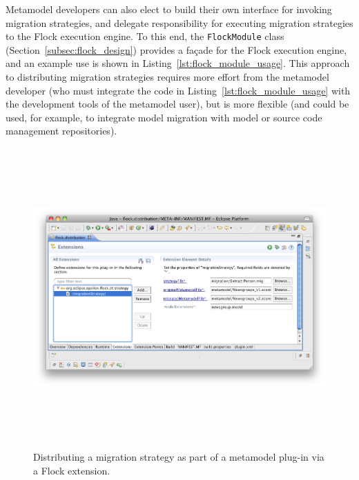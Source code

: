 Metamodel developers can also elect to build their own interface for invoking migration strategies, and delegate responsibility for executing migration strategies to the Flock execution engine. To this end, the \texttt{FlockModule} class (Section~\ref{subsec:flock_design}) provides a fa\c{c}ade \cite[pg185]{gamma95patterns} for the Flock execution engine, and an example use is shown in Listing~\ref{lst:flock_module_usage}. This approach to distributing migration strategies requires more effort from the metamodel developer (who must integrate the code in Listing~\ref{lst:flock_module_usage} with the development tools of the metamodel user), but is more flexible (and could be used, for example, to integrate model migration with model or source code management repositories).

\begin{landscape}
\begin{figure}[tbp]
	\centering
		\includegraphics[height=11.5cm]{5.Implementation/images/flock_programmers_guide/extension.png}
	\caption{Distributing a migration strategy as part of a metamodel plug-in via a Flock extension.}
	\label{fig:flock_extension}
\end{figure}
\end{landscape}


